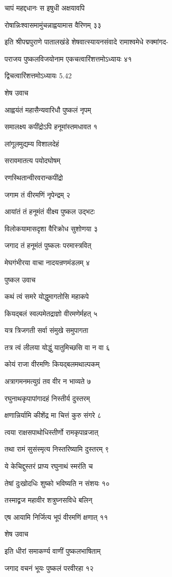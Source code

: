 चापं महद्दधानः स इषुधी अक्षयावपि

रोषान्निःश्वासमामुंचन्नाह्वयामास वैरिणम् ३३

इति श्रीपद्मपुराणे पातालखंडे शेषवात्स्यायनसंवादे रामाश्वमेधे रुक्मांगद-

पराजय पुष्कलविजयोनाम एकचत्वारिंशत्तमोऽध्यायः ४१

द्विचत्वारिंशत्तमोऽध्यायः 5.42

शेष उवाच

आह्वयंतं महासैन्यवारिधौ पुष्कलं नृपम्

समालक्ष्य कपींद्रोऽपि हनूमांस्तमधावत १

लांगूलमुद्यम्य विशालदेहं

सरावमातत्य पयोदघोषम्

रणस्थितान्वीरवरान्कपींद्रो

जगाम तं वीरमणिं नृपेन्द्रम् २

आयांतं तं हनूमंतं वीक्ष्य पुष्कल उद्भटः

विलोकयामासदृशा वैरिक्रोध सुशोणया ३

जगाद तं हनूमंतं पुष्कलः परमास्त्रवित्

मेघगंभीरया वाचा नादयन्रणमंडलम् ४

पुष्कल उवाच

कथं त्वं समरे योद्धुमागतोसि महाकपे

कियद्बलं स्वल्पमेतद्राज्ञो वीरमणेर्महत् ५

यत्र त्रिजगती सर्वा संमुखे समुपागता

तत्र त्वं लीलया योद्धुं यातुमिच्छसि वा न वा ६

कोयं राजा वीरमणिः कियद्बलमथाल्पकम्

अत्रागमनमत्युग्रं तव वीर न भाव्यते ७

रघुनाथकृपापांगादहं निस्तीर्य दुस्तरम्

क्षणान्निर्यामि कीशेंद्र मा चित्तं कुरु संगरे ८

त्वया राक्षसपाथोधिस्तीर्णो रामकृपाव्रजात्

तथा रामं सुसंस्मृत्य निस्तरिष्यामि दुस्तरम् ९

ये केचिद्दुस्तरं प्राप्य रघुनाथं स्मरंति च

तेषां दुःखोदधिः शुष्को भविष्यति न संशयः १०

तस्माद्व्रज महावीर शत्रुघ्नसविधे बलिन्

एष आयामि निर्जित्य भूपं वीरमणिं क्षणात् ११

शेष उवाच

इति धीरां समाकर्ण्य वाणीं पुष्कलभाषिताम्

जगाद वचनं भूयः पुष्कलं परवीरहा १२

